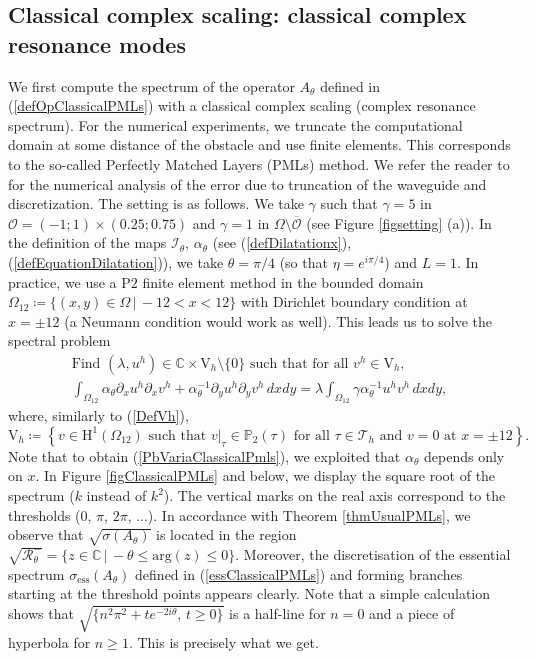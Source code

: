 \documentclass[11pt,a4paper]{report}
\newcommand{\dsp}{\displaystyle}
\newcommand{\Om}{\Omega}
\newcommand{\mrm}[1]{\mathrm{#1}}
\newcommand{\Cplx}{\mathbb{C}}
\newcommand{\mH}{\mrm{H}}
\newcommand{\mV}{\mrm{V}}
\begin{document}
\subsection{ Classical complex scaling: classical complex resonance modes} 
We first compute the spectrum of the operator $A_{\theta}$ defined in (\ref{defOpClassicalPMLs}) with a classical complex scaling (complex resonance spectrum).  For the numerical experiments, we truncate the computational domain at some distance of the obstacle and use finite elements. This corresponds to the so-called Perfectly Matched Layers (PMLs) method. We refer the reader to \cite{Kalv13} for the numerical analysis of the error due to truncation of the waveguide and discretization. The setting is as follows. We take $\gamma$ such that $\gamma=5$ in $\mathscr{O}=(-1;1)\times(0.25;0.75)$ and $\gamma=1$ in $\Om\setminus\overline{\mathscr{O}}$ (see Figure \ref{figsetting} (a)).  In the definition of the maps $\mathcal{I}_{\theta}$, $\alpha_{\theta}$ (see (\ref{defDilatationx}), (\ref{defEquationDilatation})), we take $\theta=\pi/4$ (so that $\eta=e^{i\pi/4}$) and $L=1$. In practice, we use a $\mrm{P2}$ finite element method in the bounded domain $\Om_{12}\coloneqq\{(x,y)\in\Om\,|\,-12<x<12\}$ with Dirichlet boundary condition at $x=\pm12$ (a Neumann condition would work as well). This leads us to solve the spectral problem
\begin{equation}\label{PbVariaClassicalPmls}
\begin{array}{|l}
\mbox{Find }(\lambda,u^h)\in\Cplx\times\mV_h\setminus\{0\} \mbox{ such that for all }v^h\in\mV_h,\\[3pt]
\dsp\int_{\Om_{12}}\alpha_\theta\partial_xu^h\partial_xv^h+\alpha^{-1}_\theta\partial_yu^h\partial_yv^h\,dxdy=\lambda\int_{\Om_{12}}\gamma\alpha^{-1}_\theta u^hv^h\,dxdy,
\end{array}
\end{equation}
where, similarly to (\ref{DefVh}),  
\begin{equation}\label{DefVhBis}
\mV_h \coloneqq \left\{v\in \mH^1(\Om_{12})\mbox{ such that }v|_{\tau}\in \mathbb{P}_2(\tau)\mbox{ for all }\tau\in\mathcal{T}_h\mbox{ and }v=0\mbox{ at }x=\pm12\right\}.
\end{equation}
Note that to obtain (\ref{PbVariaClassicalPmls}), we exploited that $\alpha_\theta$ depends only on $x$. In Figure \ref{figClassicalPMLs} and below, we display the square root of the spectrum ($k$ instead of $k^2$). The vertical marks on the real axis correspond to the thresholds ($0$, $\pi$, $2\pi$, ...). In accordance with Theorem \ref{thmUsualPMLs}, we observe that $\sqrt{\sigma(A_{\theta})}$ is located in the region $\sqrt{\mathscr{R}_{\theta}^-}=\{z\in\Cplx\,|\,-\theta\le\mrm{arg}(z)\le 0\}$. Moreover, the discretisation of the essential spectrum $\sigma_{\mrm{ess}}(A_{\theta})$ defined in (\ref{essClassicalPMLs}) and forming branches starting at the threshold points appears clearly. Note that a simple calculation shows that $\sqrt{\{n^2\pi^2+te^{-2i\theta},\,t\ge0\}}$ is a half-line for $n=0$ and a piece of hyperbola for $n\ge1$. This is precisely what we get. 
\end{document}

